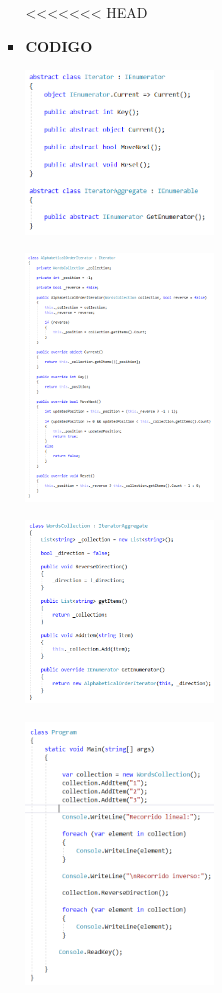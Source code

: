 \documentclass[twoside,twocolumn]{article}
\begin{document}
\begin{itemize}
\begin{itemize}
\begin{itemize}
<<<<<<< HEAD
    \item \textbf{CODIGO}
    \begin{center}
        \includegraphics[width=5cm]{./img/Iterator1.png} 
    \end{center}
    \begin{center}
        \includegraphics[width=5cm]{./img/Iterator2.png} 
    \end{center}
    \begin{center}
        \includegraphics[width=5cm]{./img/Iterator3.png} 
    \end{center}
    \begin{center}
        \includegraphics[width=5cm]{./img/Iterator4.png} 

\end{center}
\end{itemize}
\end{itemize}
\end{itemize}
\end{document}
